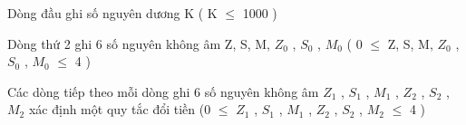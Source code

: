 Dòng đầu ghi số nguyên dương K ( K  $\le$  1000 )

Dòng thứ 2 ghi 6 số nguyên không âm Z, S, M, $Z_{0}$ , $S_{0}$ , $M_{0}$ ( 0  $\le$  Z, S, M, $Z_{0}$ , $S_{0}$ , $M_{0}$  $\le$  4 )

Các dòng tiếp theo mỗi dòng ghi 6 số nguyên không âm $Z_{1}$ , $S_{1}$ , $M_{1}$ , $Z_{2}$ , $S_{2}$ , $M_{2}$ xác định một quy tắc đổi tiền (0  $\le$  $Z_{1}$ , $S_{1}$ , $M_{1}$ , $Z_{2}$ , $S_{2}$ , $M_{2}$  $\le$  4 )
